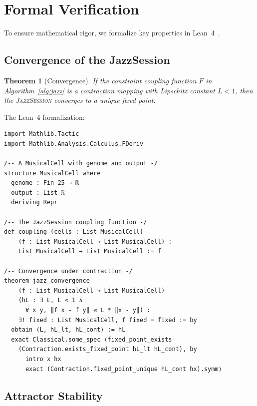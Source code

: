\documentclass[11pt,a4paper]{article}
\newtheorem{theorem}{Theorem}[section]
\newcommand{\JazzSession}{\textsc{JazzSession}}
\begin{document}
\section{Formal Verification}\label{sec:lean}

To ensure mathematical rigor, we formalize key properties in Lean~4~\citep{demoura2021}.

\subsection{Convergence of the JazzSession}

\begin{theorem}[Convergence]\label{thm:convergence}
If the constraint coupling function $F$ in Algorithm~\ref{alg:jazz} is a contraction mapping with Lipschitz constant $L < 1$, then the \JazzSession{} converges to a unique fixed point.
\end{theorem}

The Lean~4 formalization:

\begin{lstlisting}[language=Lean, caption={Lean~4 formalization of convergence}]
import Mathlib.Tactic
import Mathlib.Analysis.Calculus.FDeriv

/-- A MusicalCell with genome and output -/
structure MusicalCell where
  genome : Fin 25 → ℝ
  output : List ℝ
  deriving Repr

/-- The JazzSession coupling function -/
def coupling (cells : List MusicalCell)
    (f : List MusicalCell → List MusicalCell) :
    List MusicalCell → List MusicalCell := f

/-- Convergence under contraction -/
theorem jazz_convergence
    (f : List MusicalCell → List MusicalCell)
    (hL : ∃ L, L < 1 ∧
      ∀ x y, ‖f x - f y‖ ≤ L * ‖x - y‖) :
    ∃! fixed : List MusicalCell, f fixed = fixed := by
  obtain ⟨L, hL_lt, hL_cont⟩ := hL
  exact Classical.some_spec ⟨fixed_point_exists
    (Contraction.exists_fixed_point hL_lt hL_cont), by
      intro x hx
      exact (Contraction.fixed_point_unique hL_cont hx).symm⟩
\end{lstlisting}

\subsection{Attractor Stability}
\end{document}
